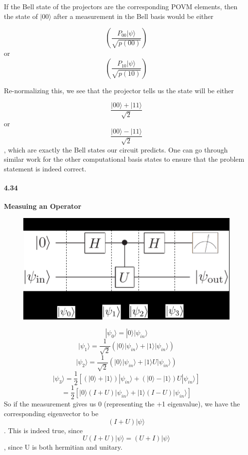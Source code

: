 If the Bell state of the projectors are the corresponding POVM elements, then the state of $|00\rangle$ after a measurement in the Bell basis would be either 


$$\left(\frac{P_{00}|\psi\rangle}{\sqrt{p(00)}}\right)$$ or$$\left(\frac{P_{10}|\psi\rangle}{\sqrt{p(10)}}\right)$$


Re-normalizing this, we see that the projector tells us the state will be either


$$\frac{|00\rangle + |11\rangle}{\sqrt{2}}$$ or $$\frac{|00\rangle - |11\rangle}{\sqrt{2}}$$, which are exactly the Bell states our circuit predicts. One can go through similar work for the other computational basis states to ensure that the problem statement is indeed correct.


\paragraph{4.34} \textbf{Measuing an Operator}
\\

\begin{figure}[h!]
    \centering
    \includegraphics{Chapter 4/4.34.png}
    
    \label{fig:my_label}
\end{figure}

$$|\psi_0\rangle = |0\rangle |\psi_{in}\rangle$$
$$|\psi_1\rangle = \frac{1}{\sqrt{2}}(|0\rangle |\psi_{in} \rangle + |1\rangle |\psi_{in}\rangle)$$
$$|\psi_2\rangle = \frac{1}{\sqrt{2}}(|0\rangle |\psi_{in}\rangle + |1\rangle U|\psi_{in}\rangle)$$
$$|\psi_3\rangle = \frac{1}{2}\left[ (|0\rangle + |1\rangle) |\psi_{in}\rangle + (|0\rangle - |1\rangle)U |\psi_{in}\rangle \right]$$
$$ = \frac{1}{2}\left[|0\rangle (I + U)|\psi_{in}\rangle + |1\rangle (I - U) |\psi_{in}\rangle \right]$$
So if the measurement gives us 0 (representing the +1 eigenvalue), we have the corresponding eigenvector to be $$(I+U)|\psi\rangle$$. This is indeed true, since $$U(I+U)|\psi\rangle = (U+I)|\psi\rangle$$, since U is both hermitian and unitary. 


